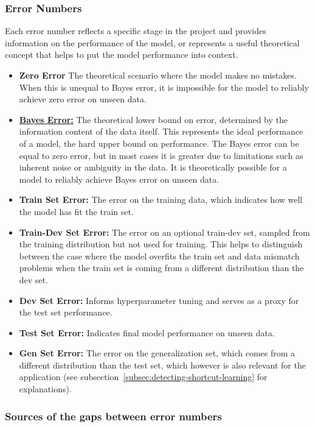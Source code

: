 \documentclass[12pt,openany]{book}
\begin{document}
\subsubsection{Error Numbers}
Each error number reflects a specific stage in the project and provides information on the performance of the model, or represents a useful theoretical concept that helps to put the model performance into context.
\begin{itemize}
    \item \textbf{Zero Error} The theoretical scenario where the model makes no mistakes. When this is unequal to Bayes error, it is impossible for the model to reliably achieve zero error on unseen data.
    \item \textbf{\hyperref[subsec:Bayes_error]{Bayes Error:}} The theoretical lower bound on error, determined by the information content of the data itself. This represents the ideal performance of a model, the hard upper bound on performance. The Bayes error can be equal to zero error, but in most cases it is greater due to limitations such as inherent noise or ambiguity in the data. It is theoretically possible for a model to reliably achieve Bayes error on unseen data.
    \item \textbf{Train Set Error:} The error on the training data, which indicates how well the model has fit the train set.
    \item \textbf{Train-Dev Set Error:} The error on an optional train-dev set, sampled from the training distribution but not used for training. This helps to distinguish between the case where the model overfits the train set and data mismatch problems when the train set is coming from a different distribution than the dev set.
    \item \textbf{Dev Set Error:} Informs hyperparameter tuning and serves as a proxy for the test set performance.
    \item \textbf{Test Set Error:} Indicates final model performance on unseen data.
    \item \textbf{Gen Set Error:} The error on the generalization set, which comes from a different distribution than the test set, which however is also relevant for the application (see subsection~\ref{subsec:detecting-shortcut-learning} for explanations).
\end{itemize}

\subsubsection{Sources of the gaps between error numbers}
\end{document}
